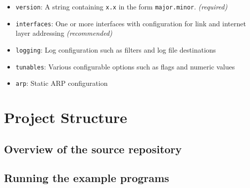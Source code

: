 \begin{appendices}
        \begin{itemize}[noitemsep]
            \item{\texttt{version}: A string containing \texttt{x.x} in the form \texttt{major.minor}. \textit{(required)}}
            \item{\texttt{interfaces}: One or more interfaces with configuration for link and internet layer addressing \textit{(recommended)}}
            \item{\texttt{logging}: Log configuration such as filters and log file destinations}
            \item{\texttt{tunables}: Various configurable options such as flags and numeric values}
            \item{\texttt{arp}: Static ARP configuration}
        \end{itemize}

\onecolumn

\chapter{Project Structure}\label{apx:proj-structure}

\section{Overview of the source repository}


\section{Running the example programs}


\end{appendices}
